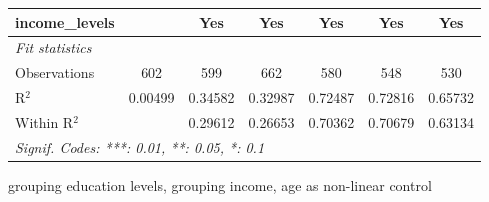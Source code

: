 \begin{tabular}{lcccccc}
   income\_levels                            &          & Yes           & Yes          & Yes      & Yes      & Yes\\  
   \midrule
   \emph{Fit statistics}\\
   Observations                              & 602      & 599           & 662          & 580      & 548      & 530\\  
   R$^2$                                     & 0.00499  & 0.34582       & 0.32987      & 0.72487  & 0.72816  & 0.65732\\  
   Within R$^2$                              &          & 0.29612       & 0.26653      & 0.70362  & 0.70679  & 0.63134\\  
   \midrule \midrule
   \multicolumn{7}{l}{\emph{Signif. Codes: ***: 0.01, **: 0.05, *: 0.1}}\\
\end{tabular}
 
\par \raggedright 
grouping education levels, grouping income, age as non-linear control
\par\endgroup



